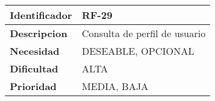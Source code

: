 \begin{center}
    \begin{tabular}{|p{2.6cm}|p{12cm}|}
    \hline
    \textbf{Identificador} & RF-29\\
    \hline
    \textbf{Descripcion} & Consulta de perfil de usuario\\
    \hline
    \textbf{Necesidad} & DESEABLE, OPCIONAL\\
    \hline
    \textbf{Dificultad} & ALTA\\
    \hline
    \textbf{Prioridad} & MEDIA, BAJA\\
    \hline
    \end{tabular}
\end{center}
